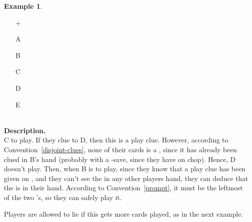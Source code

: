 \documentclass[a4paper]{article}
\theoremstyle{plain}
\theoremstyle{definition}
\newtheorem{example}[theorem]{Example}
\begin{document}
\begin{example} \hfill \\
	\begin{minipage}{0.45\textwidth}
		\begin{itemize}
			\item[\Large +]      
			\item[\Large A]    
			\item[\Large B]    
			\item[\Large C]    
			\item[\Large D]    
			\item[\Large E]    
		\end{itemize}
	\end{minipage}%
	\begin{minipage}{0.55\textwidth}
		\hfill \\
		
		\textbf{Description.} \\
		
		C to play. If they clue  to D, then this is a play clue. However, according to Convention~\ref{disjoint-clues}, none of their cards is a , since it has already been clued in B's hand (probably with a -save, since they have  on chop). Hence, D doesn't play. Then, when B is to play, since they know that a play clue has been given on , and they can't see the  in any other players hand, they can deduce that the  is in their hand. According to Convention~\ref{prompt}, it must be the leftmost of the two 's, so they can safely play it.
	\end{minipage}
\end{example} \vspace{0.15 cm}

Players are allowed to lie if this gets more cards played, as in the next example.
\end{document}
